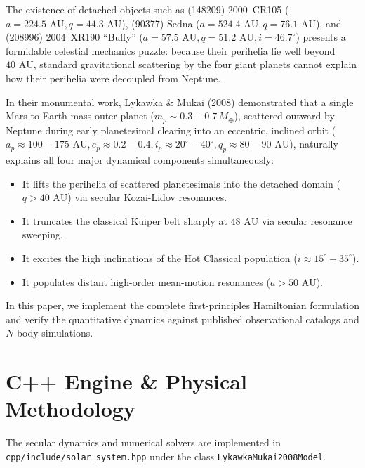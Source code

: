 \documentclass[11pt,a4paper]{article}
\begin{document}
The existence of detached objects such as (148209) 2000~CR105 ($a = 224.5\text{ AU}, q = 44.3\text{ AU}$), (90377) Sedna ($a = 524.4\text{ AU}, q = 76.1\text{ AU}$), and (208996) 2004~XR190 ``Buffy'' ($a = 57.5\text{ AU}, q = 51.2\text{ AU}, i = 46.7^\circ$) presents a formidable celestial mechanics puzzle: because their perihelia lie well beyond $40\text{ AU}$, standard gravitational scattering by the four giant planets cannot explain how their perihelia were decoupled from Neptune.

In their monumental work, Lykawka \& Mukai (2008) demonstrated that a single Mars-to-Earth-mass outer planet ($m_p \sim 0.3 - 0.7\,M_\oplus$), scattered outward by Neptune during early planetesimal clearing into an eccentric, inclined orbit ($a_p \approx 100 - 175\text{ AU}, e_p \approx 0.2 - 0.4, i_p \approx 20^\circ - 40^\circ, q_p \approx 80 - 90\text{ AU}$), naturally explains all four major dynamical components simultaneously:
\begin{itemize}
  \item It lifts the perihelia of scattered planetesimals into the detached domain ($q > 40\text{ AU}$) via secular Kozai-Lidov resonances.
  \item It truncates the classical Kuiper belt sharply at $48\text{ AU}$ via secular resonance sweeping.
  \item It excites the high inclinations of the Hot Classical population ($i \approx 15^\circ - 35^\circ$).
  \item It populates distant high-order mean-motion resonances ($a > 50\text{ AU}$).
\end{itemize}

In this paper, we implement the complete first-principles Hamiltonian formulation and verify the quantitative dynamics against published observational catalogs and $N$-body simulations.

\section{C++ Engine \& Physical Methodology}
The secular dynamics and numerical solvers are implemented in \texttt{cpp/include/solar\_system.hpp} under the class \texttt{LykawkaMukai2008Model}.
\end{document}
